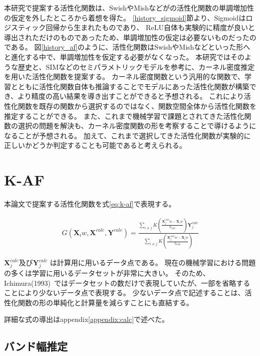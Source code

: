 本研究で提案する活性化関数は、SwishやMishなどがの活性化関数の単調増加性の仮定を外したところから着想を得た。
\ref{history_sigmoid}節より、Sigmoidはロジスティック回帰から生まれたものであり、
ReLU自体も実験的に精度が良いと導出されただけのものであったため、単調増加性の仮定は必要ないものだったのである。
図\ref{history_af}のように、活性化関数はSwishやMishなどといった形へと進化する中で、単調増加性を仮定する必要がなくなった。
本研究ではそのような歴史と、SIMなどのセミパラメトリックモデルを参考に、カーネル密度推定を用いた活性化関数を提案する。
カーネル密度関数という汎用的な関数で、学習とともに活性化関数自体も推論することでモデルにあった活性化関数が構築でき、より精度の高い結果を導き出すことができると予想される。
これにより活性化関数を既存の関数から選択するのではなく、関数空間全体から活性化関数を推定することができる。
また、これまで機械学習で課題とされてきた活性化関数の選択の問題を解決も、カーネル密度関数の形を考察することで導けるようになることが予想される。
加えて、これまで選択してきた活性化関数が実験的に正しいかどうか判定することも可能であると考えられる。




\section{K-AF}
\label {math}
本論文で提案する活性化関数を式\ref{eq:k-af}で表現する。

\begin{eqnarray}
G(\mathbf{X}_iw, \mathbf{X}^{calc}, \mathbf{Y}^{calc})=\frac{\sum_{i\neq j} K\left(\frac{\mathbf{X}^{calc}_j w - \mathbf{X}_i w}{h_{calc}}\right)\mathbf{Y}^{calc}_j}{\sum_{i\neq j} K\left(\frac{\mathbf{X}^{calc}_j w - \mathbf{X}_i w}{h_{calc}}\right)}
\label{eq:k-af}
\end{eqnarray}


$ \mathbf{X}^{calc}_j $及び$ \mathbf{Y}^{calc}_j $ は計算用に用いるデータ点である。
現在の機械学習における問題の多くは学習に用いるデータセットが非常に大きい。
そのため、Ichimura(1993)~\cite{ichimura}ではデータセットの数だけで表現していたが、一部を省略することにより少ないデータ点で表現する。
少ないデータ点で記述することは、活性化関数の形の単純化と計算量を減らすことにも直結する。

詳細な式の導出はappendix\ref{appendix:calc}で述べた。


\subsection{バンド幅推定}


